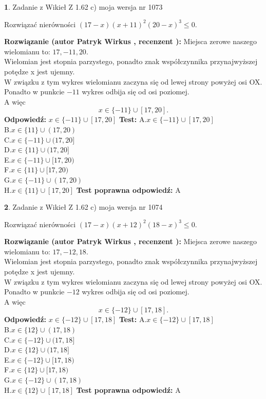 \documentclass[12pt, a4paper]{article}
\theoremstyle{definition} %
\newtheorem{zad}{}
\newcommand{\zadStart}[1]{\begin{zad}#1\newline}
\newcommand{\zadStop}{\end{zad}}
\newcommand{\rozwStart}[2]{\noindent \textbf{Rozwiązanie (autor #1 , recenzent #2): }\newline}
\newcommand{\rozwStop}{\newline}
\newcommand{\odpStart}{\noindent \textbf{Odpowiedź:}\newline}
\newcommand{\odpStop}{\newline}
\newcommand{\testStart}{\noindent \textbf{Test:}\newline}
\newcommand{\testStop}{\newline}
\newcommand{\kluczStart}{\noindent \textbf{Test poprawna odpowiedź:}\newline}
\newcommand{\kluczStop}{\newline}
\begin{document}
\zadStart{Zadanie z Wikieł Z 1.62 c) moja wersja nr 1073}

Rozwiązać nierówności $(17-x)(x+11)^{2}(20-x)^{3}\le0$.
\zadStop
\rozwStart{Patryk Wirkus}{}
Miejsca zerowe naszego wielomianu to: $17, -11, 20$.\\
Wielomian jest stopnia parzystego, ponadto znak współczynnika przy\linebreak najwyższej potędze x jest ujemny.\\ W związku z tym wykres wielomianu zaczyna się od lewej strony powyżej osi OX.\\
Ponadto w punkcie $-11$ wykres odbija się od osi poziomej.\\
A więc $$x \in \{-11\} \cup [17,20].$$
\rozwStop
\odpStart
$x \in \{-11\} \cup [17,20]$
\odpStop
\testStart
A.$x \in \{-11\} \cup [17,20]$\\
B.$x \in \{11\} \cup (17,20)$\\
C.$x \in \{-11\} \cup (17,20]$\\
D.$x \in \{11\} \cup (17,20]$\\
E.$x \in \{-11\} \cup [17,20)$\\
F.$x \in \{11\} \cup [17,20)$\\
G.$x \in \{-11\} \cup (17,20)$\\
H.$x \in \{11\} \cup [17,20]$
\testStop
\kluczStart
A
\kluczStop



\zadStart{Zadanie z Wikieł Z 1.62 c) moja wersja nr 1074}

Rozwiązać nierówności $(17-x)(x+12)^{2}(18-x)^{3}\le0$.
\zadStop
\rozwStart{Patryk Wirkus}{}
Miejsca zerowe naszego wielomianu to: $17, -12, 18$.\\
Wielomian jest stopnia parzystego, ponadto znak współczynnika przy\linebreak najwyższej potędze x jest ujemny.\\ W związku z tym wykres wielomianu zaczyna się od lewej strony powyżej osi OX.\\
Ponadto w punkcie $-12$ wykres odbija się od osi poziomej.\\
A więc $$x \in \{-12\} \cup [17,18].$$
\rozwStop
\odpStart
$x \in \{-12\} \cup [17,18]$
\odpStop
\testStart
A.$x \in \{-12\} \cup [17,18]$\\
B.$x \in \{12\} \cup (17,18)$\\
C.$x \in \{-12\} \cup (17,18]$\\
D.$x \in \{12\} \cup (17,18]$\\
E.$x \in \{-12\} \cup [17,18)$\\
F.$x \in \{12\} \cup [17,18)$\\
G.$x \in \{-12\} \cup (17,18)$\\
H.$x \in \{12\} \cup [17,18]$
\testStop
\kluczStart
A
\kluczStop
\end{document}
